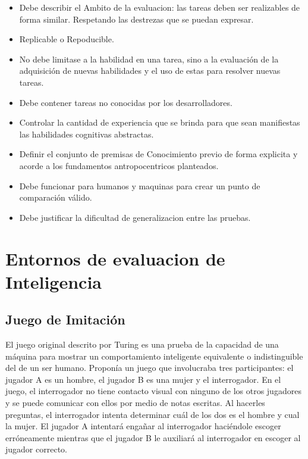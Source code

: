 \begin{itemize}
\item Debe describir el Ambito de la evaluacion: las tareas deben ser realizables de forma similar. Respetando las destrezas que se puedan expresar.
\item Replicable o Repoducible.
\item No debe limitase a la habilidad en una tarea, sino a la evaluación de la adquisición de nuevas habilidades y el uso de estas para resolver nuevas tareas.
\item Debe contener tareas no conocidas por los desarrolladores.
\item Controlar la cantidad de experiencia que se brinda para que sean manifiestas las habilidades cognitivas abstractas.
\item Definir el conjunto de premisas de Conocimiento previo de forma explicita y acorde a los fundamentos antropocentricos planteados.
\item Debe funcionar para humanos y maquinas para crear un punto de comparación válido.
\item Debe justificar la dificultad de generalizacion entre las pruebas.
\end{itemize}

\section{Entornos de evaluacion de Inteligencia}\label{section:state-of-the-art:inteligence-evaluation-enviroments}

\subsection{Juego de Imitación}

El juego original descrito por Turing es una prueba de la capacidad de una máquina para mostrar un comportamiento inteligente equivalente o indistinguible del de un ser humano. Proponía un juego que involucraba tres participantes: el jugador A es un hombre, el jugador B es una mujer y el interrogador. En el juego, el interrogador no tiene contacto visual con ninguno de los otros jugadores y se puede comunicar con ellos por medio de notas escritas. Al hacerles preguntas, el interrogador intenta determinar cuál de los dos es el hombre y cual la mujer. El jugador A intentará engañar al interrogador haciéndole escoger erróneamente mientras que el jugador B le auxiliará al interrogador en escoger al jugador correcto. 

